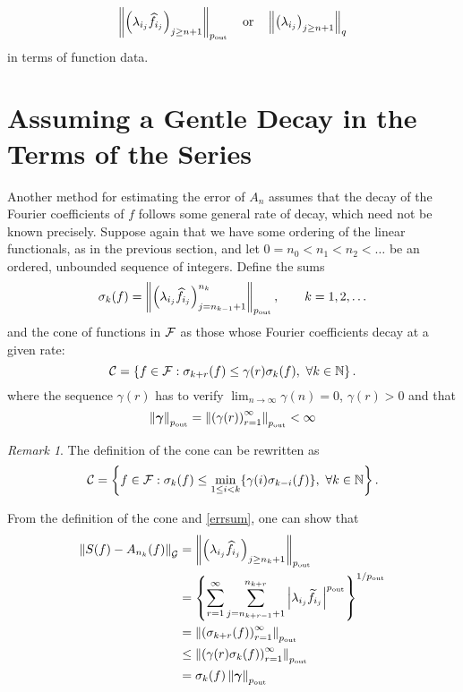 \documentclass[final]{elsarticle}
\newcommand{\pout}{p_{\text{\rm{out}}}}
\newcommand{\bgamma}{\boldsymbol\gamma}
\theoremstyle{definition}
\theoremstyle{remark}
\newtheorem{rem}{Remark}
\begin{document}
\[
\norm[\pout]{\left(\lambda_{i_j} \hf_{i_j} \right)_{j\ge n+1}} \quad \text{or} \quad \norm[q]{\left(\lambda_{i_j} \right)_{j\ge n+1}} 
\]
in terms of function data. 

\section{Assuming a Gentle Decay in the Terms of the Series}

Another method for estimating the error of $A_n$ assumes that the decay of the Fourier coefficients of $f$ follows some general rate of decay, which need not be known precisely.  Suppose again that we have some ordering of the linear functionals, as in the previous section, and let $0=n_0 < n_1 < n_2 < \ldots$ be an ordered, unbounded sequence of integers.  Define the sums
\begin{equation} \label{sumdef}
\sigma_k(f) = \norm[\pout]{ \left(\lambda_{i_j} \hf_{i_j} \right)_{j=n_{k-1}+1}^{n_k}}, \qquad k=1, 2, \ldots
\end{equation}
and the cone of functions in $\mathcal{F}$ as those whose Fourier coefficients decay at a given rate:
\begin{equation} \label{decayconedef}
\cc = \left\{ f \in \cf : \sigma_{k+r}(f) \le \gamma(r) \sigma_k (f), \ \forall k \in \naturals \right\}.
\end{equation}
where the sequence $\gamma(r)$ has to verify $\lim_{n\rightarrow\infty}\gamma(n)=0$, $\gamma(r) > 0$ and that
\begin{equation} \label{constcone}
\norm[\pout]{\bgamma}=\norm[\pout]{ \left(\gamma(r)\right)_{r=1}^\infty}<\infty
\end{equation}

\begin{rem}
The definition of the cone can be rewritten as
\begin{equation}\label{coneredef}
\mathcal{C} = \left\{ f \in \mathcal{F} : \sigma_k(f) \le \min_{1 \le i < k}\{\gamma(i)\sigma_{k-i}(f)\}, \ \forall k \in \mathbb{N} \right\}.
\end{equation}
\end{rem}

From the definition of the cone and \eqref{errsum}, one can show that
\begin{equation}\label{algoineq}
\begin{aligned}
\norm[\cg]{S(f)-A_{n_k}(f)} &= \norm[\pout]{\left(\lambda_{i_j} \hf_{i_j} \right)_{j\ge n_k+1}} \\
&= \left\{\sum_{r=1}^\infty \sum_{j=n_{k+r-1}+1}^{n_{k+r}}  \abs{\lambda_{i_j}\tf_{i_j} }^{\pout}  \right\}^{1/\pout}\\
&= \norm[\pout]{ \left(\sigma_{k+r}(f)\right)_{r=1}^{\infty}} \\
&\le \norm[\pout]{ \left(\gamma(r)\sigma_{k}(f)\right)_{r=1}^{\infty}} \\
&= \sigma_{k}(f)\norm[\pout]{\bgamma}
\end{aligned}
\end{equation}
\end{document}
